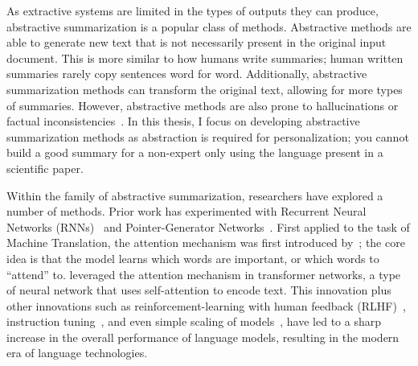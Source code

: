 As extractive systems are limited in the types of outputs they can produce, abstractive summarization is a popular class of methods. Abstractive methods are able to generate new text that is not necessarily present in the original input document. This is more similar to how humans write summaries; human written summaries rarely copy sentences word for word. Additionally, abstractive summarization methods can transform the original text, allowing for more types of summaries. However, abstractive methods are also prone to hallucinations or factual inconsistencies~\cite{Ji2022SurveyOH}. In this thesis, I focus on developing abstractive summarization methods as abstraction is required for personalization; you cannot build a good summary for a non-expert only using the language present in a scientific paper.

Within the family of abstractive summarization, researchers have explored a number of methods. Prior work has experimented with Recurrent Neural Networks (RNNs)~\cite{Rafi2021RNNEA} and Pointer-Generator Networks~\cite{see-etal-2017-get}. First applied to the task of Machine Translation, the attention mechanism was first introduced by~\textcite{Bahdanau2014NeuralMT}; the core idea is that the model learns which words are important, or which words to ``attend'' to. \textcite{Vaswani2017AttentionIA} leveraged the attention mechanism in transformer networks, a type of neural network that uses self-attention to encode text. This innovation plus other innovations such as reinforcement-learning with human feedback (RLHF)~\cite{NIPS2017_d5e2c0ad, NEURIPS2022_b1efde53}, instruction tuning~\cite{wei2022finetuned,chung2022scaling}, and even simple scaling of models~\cite{kaplan2020scaling, hoffmann2022training, Wei2022EmergentAO}, have led to a sharp increase in the overall performance of language models, resulting in the modern era of language technologies. 


